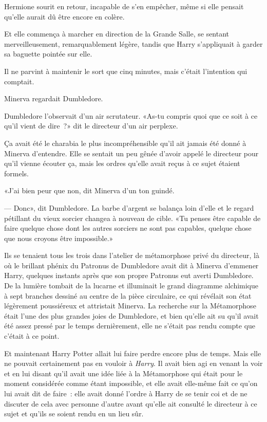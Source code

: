 Hermione sourit en retour, incapable de s'en empêcher, même si elle pensait qu'elle aurait dû être encore en colère.

Et elle commença à marcher en direction de la Grande Salle, se sentant merveilleusement, remarquablement légère, tandis que Harry s'appliquait à garder sa baguette pointée sur elle.

Il ne parvint à maintenir le sort que cinq minutes, mais c'était l'intention qui comptait.

\later

Minerva regardait Dumbledore.

Dumbledore l'observait d'un air scrutateur. «As-tu compris quoi que ce soit à ce qu'il vient de dire~?» dit le directeur d'un air perplexe.

Ça avait été le charabia le plus incompréhensible qu'il ait jamais été donné à Minerva d'entendre. Elle se sentait un peu gênée d'avoir appelé le directeur pour qu'il vienne écouter ça, mais les ordres qu'elle avait reçus à ce sujet étaient formels.

«J'ai bien peur que non, dit Minerva d'un ton guindé.

--- Donc», dit Dumbledore. La barbe d'argent se balança loin d'elle et le regard pétillant du vieux sorcier changea à nouveau de cible. «Tu penses être capable de faire quelque chose dont les autres sorciers ne sont pas capables, quelque chose que nous croyons être impossible.»

Ils se tenaient tous les trois dans l'atelier de métamorphose privé du directeur, là où le brillant phénix du Patronus de Dumbledore avait dit à Minerva d'emmener Harry, quelques instants après que son propre Patronus eut averti Dumbledore. De la lumière tombait de la lucarne et illuminait le grand diagramme alchimique à sept branches dessiné au centre de la pièce circulaire, ce qui révélait son état légèrement poussiéreux et attristait Minerva. La recherche sur la Métamorphose était l'une des plus grandes joies de Dumbledore, et bien qu'elle ait su qu'il avait été assez pressé par le temps dernièrement, elle ne s'était pas rendu compte que c'était à ce point.

Et maintenant Harry Potter allait lui faire perdre encore plus de temps. Mais elle ne pouvait certainement pas en vouloir à \emph{Harry}. Il avait bien agi en venant la voir et en lui disant qu'il avait une idée liée à la Métamorphose qui était pour le moment considérée comme étant impossible, et elle avait elle-même fait ce qu'on lui avait dit de faire~: elle avait donné l'ordre à Harry de se tenir coi et de ne discuter de cela avec personne d'autre avant qu'elle ait consulté le directeur à ce sujet et qu'ils se soient rendu en un lieu sûr.


